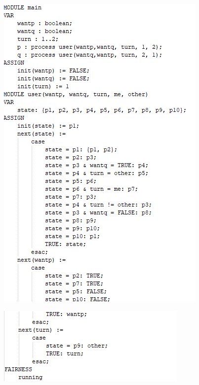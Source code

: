 \documentclass{article}
\begin{document}
\begin{figure}[h] 
\centering
\includegraphics[scale=0.8]{3.10nusmv.png}
\end{figure}
\begin{figure}[h] 
\centering
\includegraphics[scale=0.8]{3.101nusmv.png}
\end{figure}
\end{document}
